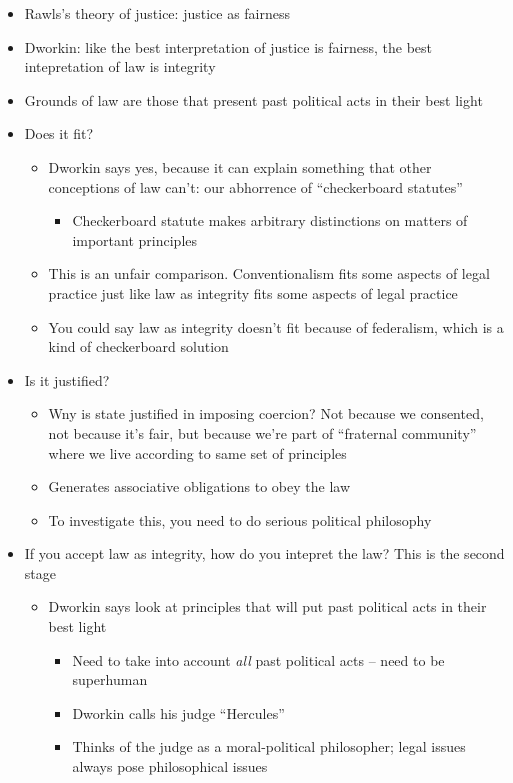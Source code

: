 \begin{itemize}
\tightlist
\item
  Rawls's theory of justice: justice as fairness
\item
  Dworkin: like the best interpretation of justice is fairness, the best
  intepretation of law is integrity
\item
  Grounds of law are those that present past political acts in their
  best light
\item
  Does it fit?

  \begin{itemize}
  \tightlist
  \item
    Dworkin says yes, because it can explain something that other
    conceptions of law can't: our abhorrence of ``checkerboard
    statutes''

    \begin{itemize}
    \tightlist
    \item
      Checkerboard statute makes arbitrary distinctions on matters of
      important principles
    \end{itemize}
  \item
    This is an unfair comparison. Conventionalism fits some aspects of
    legal practice just like law as integrity fits some aspects of legal
    practice
  \item
    You could say law as integrity doesn't fit because of federalism,
    which is a kind of checkerboard solution
  \end{itemize}
\item
  Is it justified?

  \begin{itemize}
  \tightlist
  \item
    Wny is state justified in imposing coercion? Not because we
    consented, not because it's fair, but because we're part of
    ``fraternal community'' where we live according to same set of
    principles
  \item
    Generates associative obligations to obey the law
  \item
    To investigate this, you need to do serious political philosophy
  \end{itemize}
\item
  If you accept law as integrity, how do you intepret the law? This is
  the second stage

  \begin{itemize}
  \tightlist
  \item
    Dworkin says look at principles that will put past political acts in
    their best light

    \begin{itemize}
    \tightlist
    \item
      Need to take into account \emph{all} past political acts -- need
      to be superhuman
    \item
      Dworkin calls his judge ``Hercules''
    \item
      Thinks of the judge as a moral-political philosopher; legal issues
      always pose philosophical issues
    \end{itemize}
  \end{itemize}
\end{itemize}

